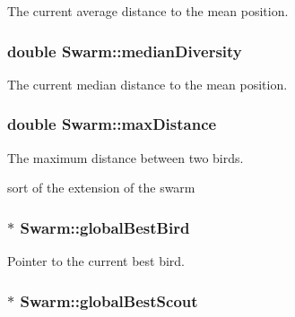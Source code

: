 The current average distance to the mean position. 

\hypertarget{classSwarm_97f31d54d0cc328f7ca763c447338b02}{
\subsubsection{\setlength{\rightskip}{0pt plus 5cm}double {\bf Swarm::medianDiversity}}}
\label{classSwarm_97f31d54d0cc328f7ca763c447338b02}


The current median distance to the mean position. 

\hypertarget{classSwarm_a2cca0442b7f5e40f52dfd22d0d2b7e7}{
\subsubsection{\setlength{\rightskip}{0pt plus 5cm}double {\bf Swarm::maxDistance}}}
\label{classSwarm_a2cca0442b7f5e40f52dfd22d0d2b7e7}


The maximum distance between two birds. 

sort of the extension of the swarm \hypertarget{classSwarm_847c3f9482dcc400c9a0b6adf923c475}{
\subsubsection{$\ast$ {\bf Swarm::globalBestBird}}}
\label{classSwarm_847c3f9482dcc400c9a0b6adf923c475}


Pointer to the current best bird. 

\hypertarget{classSwarm_a584ad92de2862942728b4d4a38bafd1}{
\subsubsection{$\ast$ {\bf Swarm::globalBestScout}}}
\label{classSwarm_a584ad92de2862942728b4d4a38bafd1}


